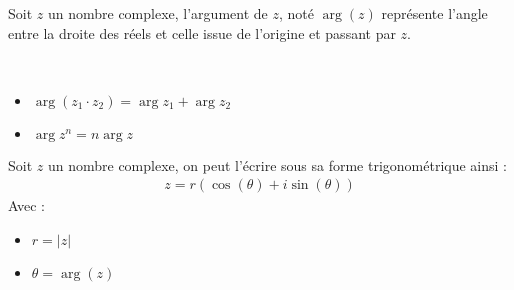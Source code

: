 \begin{definition}
    Soit $z$ un nombre complexe, l'argument de $z$, noté $\arg{(z)}$ représente l'angle entre la droite des réels et celle issue de l'origine et passant par $z$.
\end{definition}

\begin{proposition}~
    \begin{itemize}
        \item $\arg{(z_1 \cdot z_2)} = \arg{z_1} + \arg{z_2}$
        \item $\arg{z^n} = n\arg{z}$
    \end{itemize}
\end{proposition}

\begin{definition}
    Soit $z$ un nombre complexe, on peut l'écrire sous sa forme trigonométrique ainsi :
    \begin{align*}
        z = r (\cos{(\theta)} + i \sin{(\theta)})
    \end{align*}
    Avec :
    \begin{itemize}
        \item $r = |z|$
        \item $\theta = \arg{(z)}$
    \end{itemize}
\end{definition}

